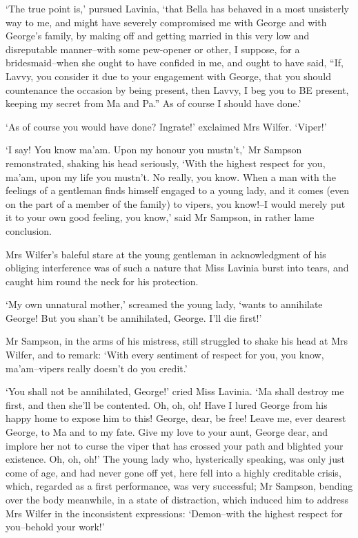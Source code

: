 ‘The true point is,’ pursued Lavinia, ‘that Bella has behaved in a most
unsisterly way to me, and might have severely compromised me with George
and with George’s family, by making off and getting married in this very
low and disreputable manner--with some pew-opener or other, I suppose,
for a bridesmaid--when she ought to have confided in me, and ought
to have said, “If, Lavvy, you consider it due to your engagement with
George, that you should countenance the occasion by being present, then
Lavvy, I beg you to BE present, keeping my secret from Ma and Pa.” As of
course I should have done.’

‘As of course you would have done? Ingrate!’ exclaimed Mrs Wilfer.
‘Viper!’

‘I say! You know ma’am. Upon my honour you mustn’t,’ Mr Sampson
remonstrated, shaking his head seriously, ‘With the highest respect for
you, ma’am, upon my life you mustn’t. No really, you know. When a man
with the feelings of a gentleman finds himself engaged to a young lady,
and it comes (even on the part of a member of the family) to vipers, you
know!--I would merely put it to your own good feeling, you know,’ said
Mr Sampson, in rather lame conclusion.

Mrs Wilfer’s baleful stare at the young gentleman in acknowledgment of
his obliging interference was of such a nature that Miss Lavinia burst
into tears, and caught him round the neck for his protection.

‘My own unnatural mother,’ screamed the young lady, ‘wants to annihilate
George! But you shan’t be annihilated, George. I’ll die first!’

Mr Sampson, in the arms of his mistress, still struggled to shake his
head at Mrs Wilfer, and to remark: ‘With every sentiment of respect for
you, you know, ma’am--vipers really doesn’t do you credit.’

‘You shall not be annihilated, George!’ cried Miss Lavinia. ‘Ma shall
destroy me first, and then she’ll be contented. Oh, oh, oh! Have I lured
George from his happy home to expose him to this! George, dear, be free!
Leave me, ever dearest George, to Ma and to my fate. Give my love to
your aunt, George dear, and implore her not to curse the viper that has
crossed your path and blighted your existence. Oh, oh, oh!’ The young
lady who, hysterically speaking, was only just come of age, and had
never gone off yet, here fell into a highly creditable crisis, which,
regarded as a first performance, was very successful; Mr Sampson,
bending over the body meanwhile, in a state of distraction, which
induced him to address Mrs Wilfer in the inconsistent expressions:
‘Demon--with the highest respect for you--behold your work!’

